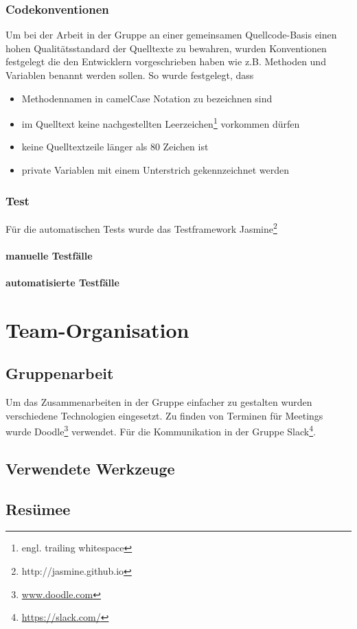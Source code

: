 \subsection{Codekonventionen}
Um bei der Arbeit in der Gruppe an einer gemeinsamen Quellcode-Basis einen hohen Qualitätsstandard der Quelltexte zu bewahren, wurden Konventionen festgelegt die den Entwicklern vorgeschrieben haben wie z.B. Methoden und Variablen benannt werden sollen. So wurde festgelegt, dass
\begin{itemize}
 \item Methodennamen in camelCase Notation zu bezeichnen sind
 \item im Quelltext keine nachgestellten Leerzeichen\footnote{engl. trailing whitespace} vorkommen dürfen
 \item keine Quelltextzeile länger als 80 Zeichen ist
 \item private Variablen mit einem Unterstrich gekennzeichnet werden
\end{itemize}

\subsection{Test}
Für die automatischen Tests wurde das Testframework Jasmine\footnote{http://jasmine.github.io}

\subsubsection{manuelle Testfälle}
\subsubsection{automatisierte Testfälle}

\chapter{Team-Organisation}
\section{Gruppenarbeit}
Um das Zusammenarbeiten in der Gruppe einfacher zu gestalten wurden verschiedene Technologien eingesetzt.
Zu finden von Terminen für Meetings wurde Doodle\footnote{\url{www.doodle.com}}  verwendet. Für die Kommunikation in der Gruppe Slack\footnote{\url{https://slack.com/}}.
\section{Verwendete Werkzeuge}
\section{Resümee}



